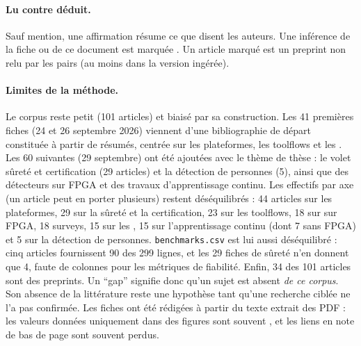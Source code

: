 \paragraph{Lu contre déduit.} Sauf mention, une affirmation résume ce que disent les
auteurs. Une inférence de la fiche ou de ce document est marquée \deduit. Un article marqué
\pp{} est un preprint non relu par les pairs (au moins dans la version ingérée).

\paragraph{Limites de la méthode.} Le corpus reste petit (101 articles) et biaisé par sa
construction. Les 41 premières fiches (24 et 26 septembre 2026) viennent d'une
bibliographie de départ constituée à partir de résumés, centrée sur les plateformes, les
toolflows et les . Les 60 suivantes (29 septembre) ont été ajoutées avec le
thème de thèse : le volet sûreté et certification (29 articles) et la détection de
personnes (5), ainsi que des détecteurs sur FPGA et des travaux d'apprentissage continu.
Les effectifs par axe (un article peut en porter plusieurs) restent déséquilibrés :
44 articles sur les plateformes, 29 sur la sûreté et la certification, 23 sur les
toolflows, 18 sur  sur FPGA, 18 surveys, 15 sur les , 15 sur
l'apprentissage continu (dont 7 sans FPGA) et 5 sur la détection de personnes.
\texttt{benchmarks.csv} est lui aussi déséquilibré : cinq articles fournissent 90 des
299 lignes, et les 29 fiches de sûreté n'en donnent que 4, faute de colonnes pour les
métriques de fiabilité. Enfin, 34 des 101 articles sont des preprints. Un \enquote{gap}
signifie donc qu'un sujet est absent \emph{de ce corpus}. Son absence de la littérature
reste une hypothèse tant qu'une recherche ciblée ne l'a pas confirmée. Les fiches ont été
rédigées à partir du texte extrait des PDF : les valeurs données uniquement dans des
figures sont souvent \nr, et les liens en note de bas de page sont souvent perdus.

